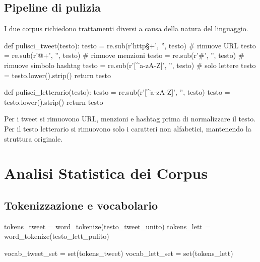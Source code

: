 ﻿\documentclass[12pt,a4paper]{article}
\begin{document}
\subsection{Pipeline di pulizia}

I due corpus richiedono trattamenti diversi a causa della natura del linguaggio.

\begin{pylisting}[title={Pulizia dei tweet e del testo letterario}]
def pulisci_tweet(testo):
    testo = re.sub(r'http\S+', '', testo)          # rimuove URL
    testo = re.sub(r'@\w+', '', testo)             # rimuove menzioni
    testo = re.sub(r'#', '', testo)                # rimuove simbolo hashtag
    testo = re.sub(r'[^a-zA-Z\s]', '', testo)     # solo lettere
    testo = testo.lower().strip()
    return testo

def pulisci_letterario(testo):
    testo = re.sub(r'[^a-zA-Z\s]', '', testo)
    testo = testo.lower().strip()
    return testo
\end{pylisting}

Per i tweet si rimuovono URL, menzioni e hashtag prima di normalizzare il testo. Per il testo letterario si rimuovono solo i caratteri non alfabetici, mantenendo la struttura originale.

\section{Analisi Statistica dei Corpus}

\subsection{Tokenizzazione e vocabolario}

\begin{pylisting}[title={Tokenizzazione e calcolo del vocabolario}]
tokens_tweet = word_tokenize(testo_tweet_unito)
tokens_lett  = word_tokenize(testo_lett_pulito)

vocab_tweet_set = set(tokens_tweet)
vocab_lett_set  = set(tokens_lett)
\end{pylisting}
\end{document}
